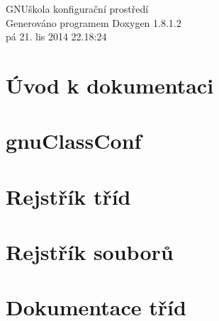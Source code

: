 \documentclass{book}
\begin{document}
\hypersetup{pageanchor=false,citecolor=blue}
\begin{titlepage}
\vspace*{7cm}
\begin{center}
{\Large G\-N\-Uškola konfigurační prostředí }\\
\vspace*{1cm}
{\large Generováno programem Doxygen 1.8.1.2}\\
\vspace*{0.5cm}
{\small pá 21. lis 2014 22.18:24}\\
\end{center}
\end{titlepage}
\clearemptydoublepage
{}
\tableofcontents
\clearemptydoublepage
{}
\hypersetup{pageanchor=true,citecolor=blue}
\chapter{Úvod k dokumentaci}
\label{index}\hypertarget{index}{}
\chapter{gnu\-Class\-Conf}
\label{md_README}
\hypertarget{md_README}{}

\chapter{Rejstřík tříd}

\chapter{Rejstřík souborů}

\chapter{Dokumentace tříd}



































\end{document}
